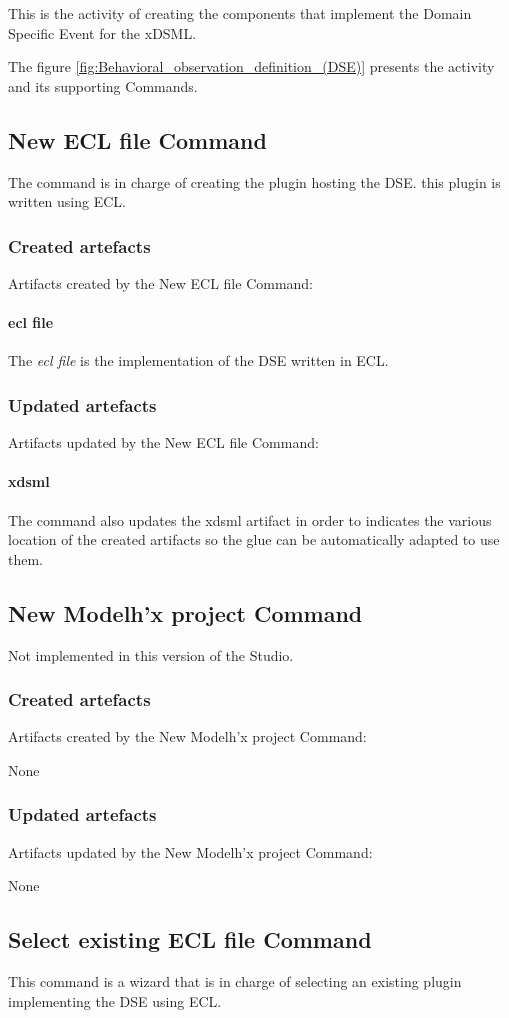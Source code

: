 \documentclass{gemoc} %
\begin{document}
This is the activity of creating the components that implement the Domain Specific Event for the xDSML.

The figure \ref{fig:Behavioral_observation_definition_(DSE)} presents the activity and its supporting Commands.

\subsection{New ECL file Command}
The command is in charge of creating the plugin hosting the DSE. this plugin is written using ECL.
\subsubsection{Created artefacts}
Artifacts created by the New ECL file Command:
\paragraph{ecl file} 
The \emph{ecl file} is the implementation of the DSE written in ECL.
\subsubsection{Updated artefacts}
Artifacts updated by the New ECL file Command:
\paragraph{xdsml} 
The command also updates the xdsml artifact in order to indicates the various location of the created artifacts so the glue can be automatically adapted to use them.

\subsection{New Modelh'x project Command}
Not implemented in this version of the Studio.
\subsubsection{Created artefacts}
Artifacts created by the New Modelh'x project Command:

	None
\subsubsection{Updated artefacts}
Artifacts updated by the New Modelh'x project Command:

	None

\subsection{Select existing ECL file Command}
This command is a wizard that is in charge of selecting an existing plugin implementing the DSE using ECL.
\end{document}
